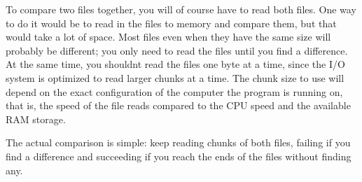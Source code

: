 
To compare two files together, you will of course have to read both
files. One way to do it would be to read in the files to memory and
compare them, but that would take a lot of space. Most files even when
they have the same size will probably be different; you only need to
read the files until you find a difference. At the same time, you
shouldn{\textquotesingle}t read the files one byte at a time, since the
I/O system is optimized to read larger chunks at a time. The chunk size
to use will depend on the exact configuration of the computer the
program is running on, that is, the speed of the file reads compared to
the CPU speed and the available RAM storage. 

The actual comparison is simple: keep reading chunks of both files,
failing if you find a difference and succeeding if you reach the ends
of the files without finding any. 

